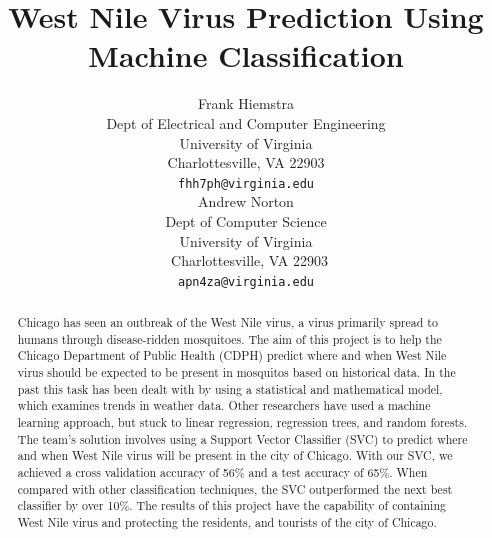 \documentclass{article} %
\title{West Nile Virus Prediction Using Machine Classification}
\author{
Frank Hiemstra \\
Dept of Electrical and Computer Engineering\\
University of Virginia\\
Charlottesville, VA 22903\\
\texttt{fhh7ph@virginia.edu} \\
\And
Andrew Norton \\
Dept of Computer Science \\
University of Virginia \\\
Charlottesville, VA 22903 \\
\texttt{apn4za@virginia.edu} \\
}
\begin{document}
\maketitle

\begin{abstract}
Chicago has seen an outbreak of the West Nile virus, a virus primarily spread to humans through disease-ridden mosquitoes.  The aim of this project is to help the Chicago Department of Public Health (CDPH) predict where and when West Nile virus should be expected to be present in mosquitos based on historical data.  In the past this task has been dealt with by using a statistical and mathematical model, which examines trends in weather data.  Other researchers have used a machine learning approach, but stuck to linear regression, regression trees, and random forests.  The team’s solution involves using a Support Vector Classifier (SVC) to predict where and when West Nile virus will be present in the city of Chicago.  With our SVC, we achieved a cross validation accuracy of 56\% and a test accuracy of 65\%. When compared with other classification techniques, the SVC outperformed the next best classifier by over 10\%. The results of this project have the capability of containing West Nile virus and protecting the residents, and tourists of the city of Chicago.
\end{abstract}
\end{document}
